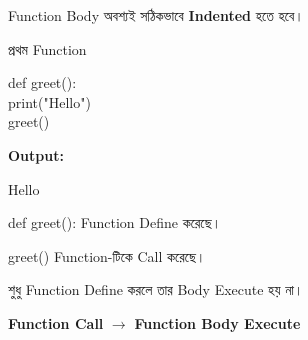 Function Body অবশ্যই সঠিকভাবে \textbf{Indented} হতে হবে।



\begin{codeoutputbox}{প্রথম Function}

\noindent
\begin{minipage}[t]{0.53\linewidth}
\codeheading

\begin{english}
\ttfamily
def greet():\\
\hspace*{4mm}print("Hello")\\[0.5mm]
greet()
\end{english}

\end{minipage}
\hfill
\begin{minipage}[t]{0.43\linewidth}
\outputheading

\textbf{Output:}

\begin{center}
\textenglish{\ttfamily Hello}
\end{center}

\textenglish{\ttfamily def greet():}
Function Define করেছে।

\textenglish{\ttfamily greet()}
Function-টিকে Call করেছে।

\end{minipage}

\end{codeoutputbox}

\begin{rememberbox}

শুধু Function Define করলে তার Body Execute হয় না।

\begin{center}

\textbf{Function Call}
\(\longrightarrow\)
\textbf{Function Body Execute}

\end{center}

\end{rememberbox}



